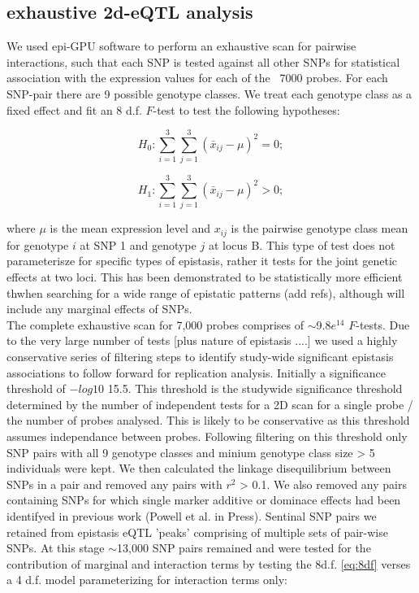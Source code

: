 \documentclass[paper=a4, fontsize=11pt]{scrartcl}	%
\numberwithin{equation}{section}									%
\numberwithin{figure}{section}										%
\numberwithin{table}{section}										%
\begin{document}
\subsection{exhaustive 2d-eQTL analysis}
We used epi-GPU software to perform an exhaustive scan for pairwise interactions, such that each SNP is tested against all other SNPs for statistical association with the expression values for each of the ~7000 probes. For each SNP-pair there are 9 possible genotype classes. We treat each genotype class as a fixed effect and fit an 8 d.f. $F$-test to test the following hypotheses:

\begin{equation}
H _0 : \sum _{i=1} ^3 \sum _{j=1} ^3 (\bar x _{ij} - \mu) ^2 = 0; 
\end{equation}

\begin{equation}
H _1 : \sum _{i=1} ^3 \sum _{j=1} ^3 (\bar x _{ij} - \mu) ^2 > 0; 
\label{eq:8df}
\end{equation}

where $\mu$ is the mean expression level and $x _{ij}$ is the pairwise genotype class mean for genotype $i$ at SNP 1 and genotype $j$ at locus B. This type of test does not parameterisze for specific types of epistasis, rather it tests for the joint genetic effects at two loci. This has been demonstrated to be statistically more efficient thwhen searching for a wide range of epistatic patterns (add refs), although will include any marginal effects of SNPs. \\[0.2cm]
 
The complete exhaustive scan for 7,000 probes comprises of $\sim$9.8$e^{14}$ $F$-tests. Due to the very large number of tests [plus nature of epistasis ....] we used a highly conservative series of filtering steps to identify study-wide significant epistasis associations to follow forward for replication analysis. Initially a significance threshold of $-log10$ 15.5. This threshold is the studywide significance threshold determined by the number of independent tests for a 2D scan for a single probe / the number of probes analysed. This is likely to be conservative as this threshold assumes independance between probes. Following filtering on this threshold only SNP pairs with all 9 genotype classes and minium genotype class size > 5 individuals were kept. We then calculated the linkage disequilibrium between SNPs in a pair and removed any pairs with $r^2$ > 0.1. We also removed any pairs containing SNPs for which single marker additive or dominace effects had been identifyed in previous work (Powell et al. in Press). Sentinal SNP pairs we retained from epistasis eQTL 'peaks' comprising of multiple sets of pair-wise SNPs. At this stage $\sim$13,000 SNP pairs remained and were tested for the contribution of marginal and interaction terms by testing the 8d.f. \ref{eq:8df} verses a 4 d.f. model parameterizing for interaction terms only:
\end{document}
